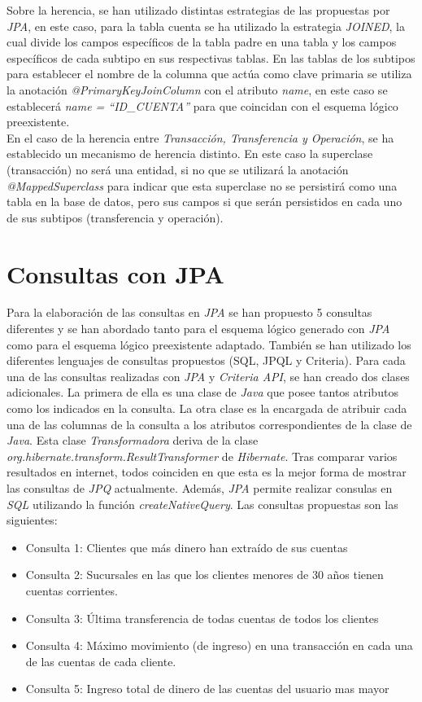 \documentclass[11pt,a4paper]{article}
\begin{document}
Sobre la herencia, se han utilizado distintas estrategias de las propuestas por \emph{JPA}, en este caso, para la tabla cuenta se ha utilizado la estrategia \emph{JOINED}, la cual divide los campos específicos de la tabla padre en una tabla y los campos específicos de cada subtipo en sus respectivas tablas. En las tablas de los subtipos para establecer el nombre de la columna que actúa como clave primaria se utiliza la anotación \emph{@PrimaryKeyJoinColumn} con el atributo \emph{name}, en este caso se establecerá \emph{name = ``ID\_{}CUENTA''} para que coincidan con el esquema lógico preexistente.\\
En el caso de la herencia entre \emph{Transacción, Transferencia y Operación}, se ha establecido un mecanismo de herencia distinto. En este caso la superclase (transacción) no será una entidad, si no que se utilizará la anotación \emph{@MappedSuperclass} para indicar que esta superclase no se persistirá como una tabla en la base de datos, pero sus campos si que serán persistidos en cada uno de sus subtipos (transferencia y operación).

\newpage
\section{Consultas con JPA}

Para la elaboración de las consultas en \emph{JPA} se han propuesto 5 consultas diferentes y se han abordado tanto para el esquema lógico generado con \emph{JPA} como para el esquema lógico preexistente adaptado. También se han utilizado los diferentes lenguajes de consultas propuestos (SQL, JPQL y Criteria). 
Para cada una de las consultas realizadas con \textit{JPA} y \textit{Criteria API}, se han creado dos clases adicionales. La primera de ella es una clase de \textit{Java} que posee tantos atributos como los indicados en la consulta. La otra clase es la encargada de atribuir cada una de las columnas de la consulta a los atributos correspondientes de la clase de \textit{Java}. Esta clase \textit{Transformadora} deriva de la clase \textit{org.hibernate.transform.ResultTransformer} de \textit{Hibernate}. Tras comparar varios resultados en internet, todos coinciden en que esta es la mejor forma de mostrar las consultas de \textit{JPQ} actualmente.
Además, \textit{JPA} permite realizar consulas en \textit{SQL} utilizando la función \textit{createNativeQuery}.
Las consultas propuestas son las siguientes:

\begin{itemize}
\item Consulta 1: Clientes que más dinero han extraído de sus cuentas
\item Consulta 2: Sucursales en las que los clientes menores de 30 años tienen cuentas corrientes.
\item Consulta 3: Última transferencia de todas cuentas de todos los clientes
\item Consulta 4: Máximo movimiento (de ingreso) en una transacción en cada una de las cuentas de cada cliente.
\item Consulta 5: Ingreso total de dinero de las cuentas del usuario mas mayor
\end{itemize}
\end{document}
